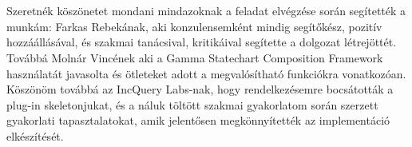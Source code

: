 \chapter*{\koszonetnyilvanitas}

Szeretnék köszönetet mondani mindazoknak a feladat elvégzése során segítették a munkám: Farkas Rebekának, aki konzulensemként mindig segítőkész, pozitív hozzáállásával, és szakmai tanácsival, kritikáival segítette a dolgozat létrejöttét. Továbbá Molnár Vincének aki a Gamma Statechart Composition Framework használatát javasolta és ötleteket adott a megvalósítható funkciókra vonatkozóan. Köszönöm továbbá az IncQuery Labs-nak, hogy rendelkezésemre bocsátották a plug-in skeletonjukat, és a náluk töltött szakmai gyakorlatom során szerzett gyakorlati tapasztalatokat, amik jelentősen megkönnyítették az implementáció elkészítését.